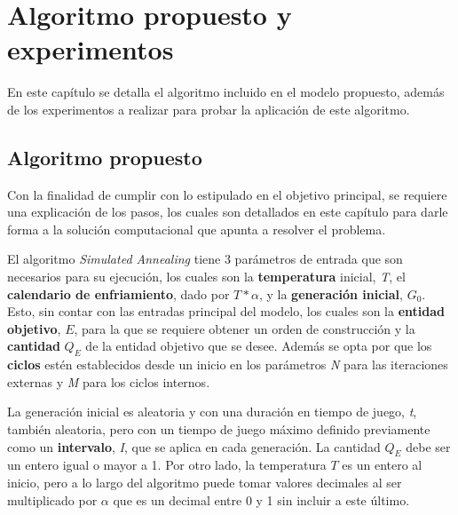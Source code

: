 \chapter{Algoritmo propuesto y experimentos}

En este capítulo se detalla el algoritmo incluido en el modelo propuesto, además de los experimentos a realizar para probar la aplicación de este algoritmo.

\section{Algoritmo propuesto}

Con la finalidad de cumplir con lo estipulado en el objetivo principal, se requiere una explicación de los pasos, los cuales son detallados en este capítulo para darle forma a la solución computacional que apunta a resolver el problema.

El algoritmo \textit{Simulated Annealing} tiene 3 parámetros de entrada que son necesarios para su ejecución, los cuales son la \textbf{temperatura} inicial, \textit{T}, el \textbf{calendario de enfriamiento}, dado por \(T * \)$\alpha$, y la \textbf{generación inicial}, $G_{0}$. Esto, sin contar con las entradas principal del modelo, los cuales son la \textbf{entidad objetivo}, $E$, para la que se requiere obtener un orden de construcción y la \textbf{cantidad} $Q_{E}$ de la entidad objetivo que se desee. Además se opta por que los \textbf{ciclos} estén establecidos desde un inicio en los parámetros \textit{N} para las iteraciones externas y \textit{M} para los ciclos internos.

La generación inicial es aleatoria y con una duración en tiempo de juego, \textit{t}, también aleatoria, pero con un tiempo de juego máximo definido previamente como un \textbf{intervalo}, \textit{I}, que se aplica en cada generación. La cantidad $Q_{E}$ debe ser un entero igual o mayor a 1. Por otro lado, la temperatura $T$ es un entero al inicio, pero a lo largo del algoritmo puede tomar valores decimales al ser multiplicado por $\alpha$ que es un decimal entre 0 y 1 sin incluir a este último. \newline

